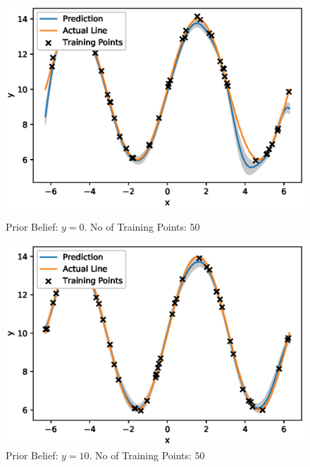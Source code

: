 \begin{figure}[H]
\centering
\begin{minipage}{.5\textwidth}
  \centering
        \includegraphics[width=\textwidth]{images/GP_Explanation/zero_const_mean_50_training.eps}
        
        \caption{Prior Belief: $y=0$. No of Training Points: 50}
        \label{fig:gp_plot_y0_50}
\end{minipage}%
\begin{minipage}{.5\textwidth}
  \centering
        \includegraphics[width=\textwidth]{images/GP_Explanation/10_const_mean_50_training.eps}
        \caption{Prior Belief: $y=10$. No of Training Points: 50}
        \label{fig:gp_plot_y10_50}
\end{minipage}
\end{figure}




